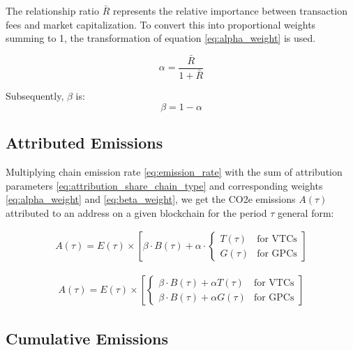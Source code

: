 \documentclass[11pt]{report}
\begin{document}
The relationship ratio $\bar{R}$ represents the relative importance between transaction fees and market capitalization. To convert this into proportional weights summing to 1, the transformation of equation \eqref{eq:alpha_weight} is used.

\begin{equation} \label{eq:alpha_weight}
    \alpha = \frac{\bar{R}}{1 + \bar{R}}
\end{equation}

Subsequently, \( \beta \) is:
\begin{equation} \label{eq:beta_weight}
    \beta = 1 - \alpha
\end{equation}


\subsection{Attributed Emissions}

Multiplying chain emission rate \eqref{eq:emission_rate} with the sum of attribution parameters \eqref{eq:attribution_share_chain_type} and corresponding weights \eqref{eq:alpha_weight} and \eqref{eq:beta_weight}, we get the CO2e emissions \(A(\tau)\) attributed to an address on a given blockchain for the period $\tau$ general form:


\begin{align}
    A(\tau) = E(\tau) \times \left[\beta \cdot B(\tau) + \alpha \cdot \begin{cases}
                                                                              T(\tau) & \text{for VTCs} \\
                                                                              G(\tau) & \text{for GPCs}
                                                                          \end{cases}\right]
\end{align}

\begin{align}
    A(\tau) = E(\tau) \times \left[\begin{cases}
                                           \beta \cdot B(\tau) + \alpha T(\tau)  & \text{for VTCs} \\
                                           \beta \cdot B(\tau) +  \alpha G(\tau) & \text{for GPCs}
                                       \end{cases}\right]
\end{align}

\subsection*{Cumulative Emissions}
\end{document}
